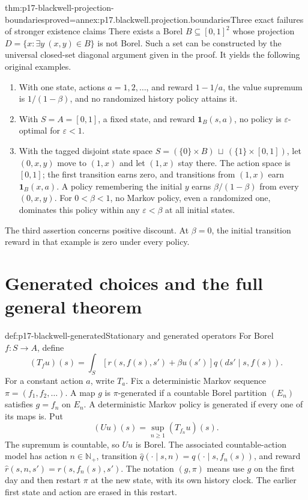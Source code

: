 \begin{hbtheorem}{thm:p17-blackwell-projection-boundaries}{proved=annex:p17.blackwell.projection.boundaries}{Three exact failures of stronger existence claims}
There exists a Borel \(B\subseteq[0,1]^2\) whose projection
\(D=\{x:\exists y\ (x,y)\in B\}\) is not Borel. Such a set
can be constructed by the universal closed-set diagonal argument
given in the proof. It yields the following original examples.
\begin{enumerate}
\item With one state, actions \(a=1,2,\ldots\), and reward
      \(1-1/a\), the value supremum is \(1/(1-\beta)\), and
      no randomized history policy attains it.
\item With \(S=A=[0,1]\), a fixed state, and reward
      \(\mathbf1_B(s,a)\), no policy is \(\varepsilon\)-optimal
      for \(\varepsilon<1\).
\item With the tagged disjoint state space
      \(S=(\{0\}\times B)\,\sqcup\,(\{1\}\times[0,1])\),
      let \((0,x,y)\) move to \((1,x)\) and let \((1,x)\)
      stay there. The action space is \([0,1]\);
      the first transition earns zero, and transitions from
      \((1,x)\) earn \(\mathbf1_B(x,a)\).
      A policy remembering the initial \(y\) earns
      \(\beta/(1-\beta)\) from every \((0,x,y)\).
      For \(0<\beta<1\), no Markov policy, even a randomized
      one, dominates this policy within any \(\varepsilon<\beta\)
      at all initial states.
\end{enumerate}
The third assertion concerns positive discount. At \(\beta=0\),
the initial transition reward in that example is zero under every policy.
\end{hbtheorem}

\section{Generated choices and the full general theorem}

\begin{hbdefinition}{def:p17-blackwell-generated}{Stationary and generated operators}
For Borel \(f:S\to A\), define
\[
 (T_f u)(s)=\int_S[r(s,f(s),s')+\beta u(s')]q(ds'\mid s,f(s)).
\]
For a constant action \(a\), write \(T_a\).
Fix a deterministic Markov sequence \(\pi=(f_1,f_2,\ldots)\).
A map \(g\) is \(\pi\)-generated if a countable Borel partition
\((E_n)\) satisfies \(g=f_n\) on \(E_n\).
A deterministic Markov policy is generated if every one of its maps is.
Put
\[
                (Uu)(s)=\sup_{n\geq1}(T_{f_n}u)(s).
\]
The supremum is countable, so \(Uu\) is Borel.
The associated countable-action model has action \(n\in\mathbb N_+\),
transition \(\widehat q(\cdot\mid s,n)=q(\cdot\mid s,f_n(s))\),
and reward \(\widehat r(s,n,s')=r(s,f_n(s),s')\).
The notation \((g,\pi)\) means use \(g\) on the first day and
then restart \(\pi\) at the new state, with its own history clock.
The earlier first state and action are erased in this restart.
\end{hbdefinition}

